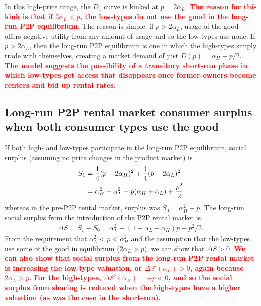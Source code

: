 \documentclass[11pt]{article}
\newcommand{\important}[1]{\textcolor{red}{\textbf{#1}}}
\newcommand{\important}[1]{#1}
\begin{document}
In this high-price range, the $D_1$ curve is kinked at $p = 2\alpha_L$. 
\important{The reason for this kink is that if $2\alpha_L < p$, the low-types do not use the good in the long-run P2P equilibrium.} 
The reason is simple: if $p > 2\alpha_L$, usage of the good offers negative utility from any amount of usage and so the low-types use none. 
If $p > 2 \alpha_L$, then the long-run P2P equilibrium is one in which the high-types simply trade with themselves, creating a market demand of just $D(p) = \alpha_H - p/2$. 
\important{The model suggests the possibility of a transitory short-run phase in which low-types get access that disappears once former-owners become renters and bid up rental rates.} 

\subsection{Long-run P2P rental market consumer surplus when both consumer types use the good} 
If both high- and low-types participate in the long-run P2P equilibrium, social surplus (assuming no price changes in the product market) is 
\begin{align} 
S_1 & = \frac{1}{4}(p - 2\alpha_H)^2 + \frac{1}{4}(p - 2\alpha_L)^2 \notag \\
    & = \alpha_H^2 + \alpha_L^2 - p(\alpha_H + \alpha_L) + \frac{p^2}{2} \notag 
\end{align} 
whereas in the pre-P2P rental market, surplus was $S_0 = \alpha_H^2 - p$.  
The long-run social surplus from the introduction of the P2P rental market is  
\begin{align}
\Delta S = S_1 - S_0 = \alpha_L^2 + (1 - \alpha_L - \alpha_H)p + p^2/2.  
\end{align} 
From the requirement that $\alpha_L^2 < p < \alpha_H^2$ and the assumption that the low-types use some of the good in equilibrium ($2 \alpha_L > p$), we can show that $\Delta S > 0$. 
\important{We can also show that social surplus from the long-run P2P rental market is increasing the low-type valuation, or $\Delta S'(\alpha_L) > 0$, again because $2\alpha_L > p$.}
\important{For the high-types, $\Delta S'(\alpha_H) = -p < 0$, and so the social surplus from sharing is 
reduced when the high-types have a higher valuation (as was the case in the short-run).}
\end{document}
